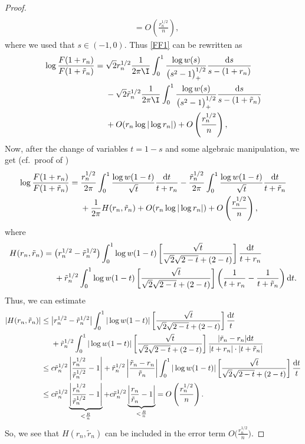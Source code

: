 \begin{proof}
\begin{align*}
 \\
 &= O\left(\frac{r_n^{1/2}}{n}\right),
\end{align*}
where we used that $s\in (-1,0)$. Thus \eqref{FF1} can be rewritten as
\begin{align*}
 \log \frac{F(1+r_n)}{F(1+\tilde r_n)}={}&
 \sqrt{2} r_n^{1/2} \frac{1}{2\pi \I}\int_{0}^1 \frac{\log w(s)}{\big(s^2-1\big)_+^{1/2}} \frac{{\rm d}s}{s-(1+r_n)}\\
 &-\sqrt{2} \tilde r_n^{1/2} \frac{1}{2\pi \I}\int_{0}^1 \frac{\log w(s)}{\big(s^2-1\big)_+^{1/2}} \frac{{\rm d}s}{s-(1+\tilde r_n)}
\\&+O(r_n \log |\log r_n|) + O\left(\frac{r_n^{1/2}}{n}\right),
\end{align*}
Now, after the change of variables $t = 1- s$ and some algebraic manipulation, we get (cf.\ proof of \cite[Proposition~A.4]{CD})
\begin{align}\nonumber
 \log \frac{F(1+r_n)}{F(1+\tilde r_n)}={}& \frac{r_n^{1/2}}{2\pi} \int_0^1 \frac{\log w(1-t)}{\sqrt{t}} \frac{{\rm d}t}{t+r_n} - \frac{\tilde r_n^{1/2}}{2\pi} \int_0^1 \frac{\log w(1-t)}{\sqrt{t}} \frac{{\rm d}t}{t+\tilde r_n} \\\label{logFF}
 &+ \frac{1}{2\pi} H(r_n, \tilde r_n) +O(r_n \log |\log r_n|) + O\left(\frac{r_n^{1/2}}{n}\right),
\end{align}
where
\begin{align*}
 H(r_n, \tilde r_n)={}& \big(r_n^{1/2}-\tilde r_n^{1/2}\big)\int_0^1 \log w(1-t) \left[\frac{\sqrt{t}}{\sqrt{2}\sqrt{2-t}+(2-t)} \right]\frac{{\rm d}t}{t+r_n}
 \\
 &+ \tilde r_n^{1/2} \int_0^1 \log w(1-t) \left[\frac{\sqrt{t}}{\sqrt{2}\sqrt{2-t}+(2-t)} \right]\left(\frac{1}{t+r_n}-\frac{1}{t+\tilde r_n}\right){\rm d}t.
\end{align*}
Thus, we can estimate
\begin{align*}
 |H(r_n, \tilde r_n)|\leq{}& \big|r_n^{1/2}-\tilde r_n^{1/2}\big| \int_0^1 |\log w(1-t)|\left[\frac{\sqrt{t}}{\sqrt{2}\sqrt{2-t}+(2-t)} \right]\frac{{\rm d}t}{t}
 \\
 &+\tilde r_n^{1/2} \int_0^1 |\log w(1-t)|\left[\frac{\sqrt{t}}{\sqrt{2}\sqrt{2-t}+(2-t)} \right]\frac{|\tilde r_n - r_n|{\rm d}t}{|t+r_n|\cdot |t+\tilde r_n|}
 \\
\leq{}& c \tilde r_n^{1/2} \left|\frac{r_n^{1/2}}{\tilde r_n^{1/2}}-1\right| + \tilde r_n^{1/2}\left|\frac{\tilde r_n - r_n}{\tilde r_n}\right| \int_0^1 |\log w(1-t)|\left[\frac{\sqrt{t}}{\sqrt{2}\sqrt{2-t}+(2-t)} \right]\frac{{\rm d}t}{t}
 \\
\leq{}& c \tilde r_n^{1/2} \underbrace{\left|\frac{r_n^{1/2}}{\tilde r_n^{1/2}}-1\right|}_{<\frac{R}{n}} + c \tilde r_n^{1/2} \underbrace{\left|\frac{r_n}{\tilde r_n}-1\right|}_{<\frac{R}{n}} = O\left(\frac{r_n^{1/2}}{n}\right).
\end{align*}
So, we see that $H(r_n, \tilde r_n)$ can be included in the error term $O\big(\frac{r_n^{1/2}}{n}\big)$.


\end{proof}
